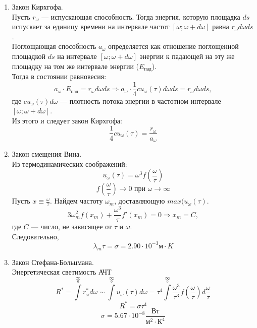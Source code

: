 \documentclass[__main__.tex]{subfiles}
\begin{document}
\begin{enumerate}
    \item
          Закон Кирхгофа.\\
          Пусть $r_{\omega}$ --- испускающая способность. Тогда энергия, которую площадка $ds$ испускает за единицу времени на интервале частот $[\omega; \omega+d\omega]$ равна $r_\omega d\omega ds$. \\
          Поглощающая способность $a_\omega$ определяется как отношение поглощенной площадкой $ds$ на интервале $[\omega;\omega+d\omega]$ энергии к падающей на эту же площадку на том же интервале энергии ($E_{\text{пад}}$).\\
          Тогда в состоянии равновесия:
          $$
              a_\omega \cdot E_{\text{пад}} = r_\omega d\omega ds \Longrightarrow a_\omega\cdot \frac{1}{4}cu_\omega(\tau)d\omega ds = r_\omega d\omega ds,
          $$
          где $cu_\omega(\tau)d\omega$ --- плотность потока энергии в частотном интервале $[\omega; \omega+d\omega]$.\\
          Из этого и следует закон Кирхгофа:
          $$
              \frac{1}{4}cu_\omega(\tau)=\frac{r_\omega}{a_\omega}
          $$
    \item
          Закон смещения Вина. \\
          Из термодинамических соображений:
          $$
              u_\omega(\tau)=\omega^3f\left(\frac{\omega}{\tau}\right)
          $$
          $$
              f\left(\frac{\omega}{\tau}\right)\longrightarrow 0 \text{  при  } \omega \longrightarrow \infty
          $$
          Пусть $x\equiv \frac{\omega}{\tau}$. Найдем частоту $\omega_m$, доставляющую $max(u_\omega (\tau)$.
          $$
              3\omega_m^2f(x_m)+\frac{\omega^3}{\tau}f'(x_m)=0 \Longrightarrow x_m=C,
          $$
          где $C$ --- число, не зависящее от $\tau$ и $\omega$.\\
          Следовательно,
          $$
              \lambda_m\tau=\sigma=2.90\cdot 10^{-3}\text{м}\cdot K
          $$
    \item
          Закон Стефана-Больцмана.\\
          Энергетическая светимость АЧТ
          $$
              R^*=\int\limits^{\infty}\limits_0 r^*_\omega d\omega \sim \int\limits^{\infty}\limits_0 u_\omega(\tau)d\omega =\tau^4 \int\limits^{\infty}\limits_0 \frac{\omega^3}{\tau^3}f\left(\frac{\omega}{\tau}\right)d\frac{\omega}{\tau}
          $$
          $$
              R^*=\sigma \tau^4
          $$
          $$
              \sigma = 5.67\cdot 10^{-8} \frac{\text{Вт}}{\text{м}^2\cdot \text{К}^4}
          $$
\end{enumerate}
\end{document}
